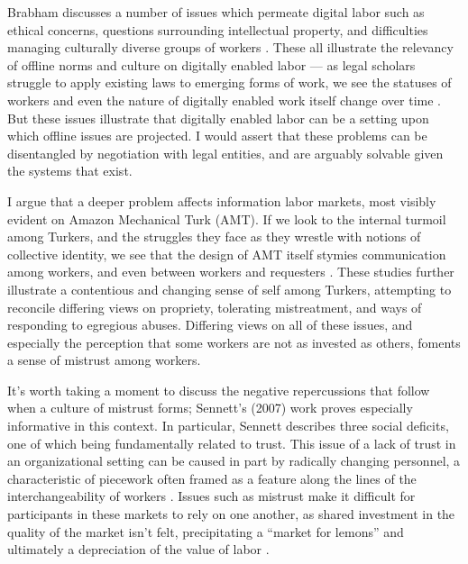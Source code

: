 \documentclass[11pt]{article}
\begin{document}
Brabham discusses a number of issues which permeate digital labor such as
ethical concerns,
questions surrounding intellectual property,
and difficulties managing culturally diverse groups of workers
\cite{brabham2013crowdsourcing}.
These all illustrate the relevancy of offline norms and culture on digitally enabled labor ---
as legal scholars struggle to apply existing laws to emerging forms of work,
we see the statuses of workers and even the nature of digitally enabled work itself change over time
\cite{fedsUber}.
But these issues illustrate that digitally enabled labor can be a setting upon which offline issues are projected.
I would assert that these problems can be disentangled by negotiation with legal entities, and are arguably solvable given the systems that exist.

I argue that a deeper problem affects information labor markets, most visibly evident on Amazon Mechanical Turk (AMT).
If we look to the internal turmoil among Turkers,
and the struggles they face as they wrestle with notions of collective identity,
we see that the design of AMT itself stymies communication among workers, and even between workers and requesters
\cite{crowdworkFuture,Ross}.
These studies further illustrate a contentious and changing sense of self among Turkers,
attempting to reconcile differing views on propriety, tolerating mistreatment, and ways of responding to egregious abuses.
Differing views on all of these issues, and especially the perception that some workers are not as invested as others, foments a sense of mistrust among workers.

It's worth taking a moment to discuss the negative repercussions that follow when a culture of mistrust forms;
Sennett's (2007) work proves especially informative in this context.
In particular, Sennett describes three social deficits, one of which being fundamentally related to trust.
This issue of a lack of trust in an organizational setting can be caused in part by radically changing personnel, a characteristic of piecework often framed as a feature along the lines of the interchangeability of workers
\cite{sennett2007culture}.
Issues such as mistrust make it difficult for participants in these markets to rely on one another,
as shared investment in the quality of the market isn't felt,
precipitating a ``market for lemons'' and ultimately a depreciation of the value of labor
\cite{akerlof1970market}.
\end{document}

